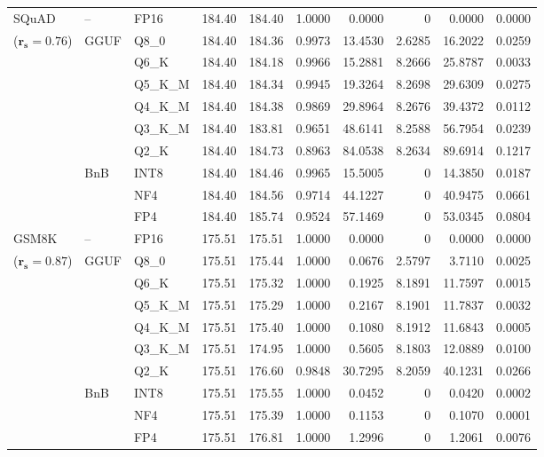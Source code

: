 \begin{longtable}{ll l rrrrrrr}
\midrule
SQuAD & -- & FP16 & 184.40 & 184.40 & 1.0000 & 0.0000 & \cellcolor{cyan!12} $0$ & 0.0000 & 0.0000 \\
{\small ($\mathbf{r_s{=}0.76}$)} & GGUF & Q8\_0 & 184.40 & 184.36 & 0.9973 & 13.4530 & 2.6285 & 16.2022 & 0.0259 \\
 &  & Q6\_K & 184.40 & 184.18 & 0.9966 & 15.2881 & 8.2666 & 25.8787 & 0.0033 \\
 &  & Q5\_K\_M & 184.40 & 184.34 & 0.9945 & 19.3264 & 8.2698 & 29.6309 & 0.0275 \\
 &  & Q4\_K\_M & 184.40 & 184.38 & 0.9869 & 29.8964 & 8.2676 & 39.4372 & 0.0112 \\
 &  & Q3\_K\_M & 184.40 & 183.81 & 0.9651 & 48.6141 & 8.2588 & 56.7954 & 0.0239 \\
 &  & Q2\_K & 184.40 & 184.73 & \cellcolor{red!18} 0.8963 & \cellcolor{red!18} 84.0538 & 8.2634 & \cellcolor{red!18} 89.6914 & \cellcolor{red!18} 0.1217 \\
 & BnB & INT8 & 184.40 & 184.46 & 0.9965 & 15.5005 & \cellcolor{cyan!12} $0$ & 14.3850 & 0.0187 \\
 &  & NF4 & 184.40 & 184.56 & 0.9714 & 44.1227 & \cellcolor{cyan!12} $0$ & 40.9475 & 0.0661 \\
 &  & FP4 & 184.40 & 185.74 & 0.9524 & 57.1469 & \cellcolor{cyan!12} $0$ & 53.0345 & 0.0804 \\
\midrule
GSM8K & -- & FP16 & 175.51 & 175.51 & 1.0000 & 0.0000 & \cellcolor{cyan!12} $0$ & 0.0000 & 0.0000 \\
{\small ($\mathbf{r_s{=}0.87}$)} & GGUF & Q8\_0 & 175.51 & 175.44 & 1.0000 & 0.0676 & 2.5797 & 3.7110 & 0.0025 \\
 &  & Q6\_K & 175.51 & 175.32 & 1.0000 & 0.1925 & 8.1891 & 11.7597 & 0.0015 \\
 &  & Q5\_K\_M & 175.51 & 175.29 & 1.0000 & 0.2167 & 8.1901 & 11.7837 & 0.0032 \\
 &  & Q4\_K\_M & 175.51 & 175.40 & 1.0000 & 0.1080 & 8.1912 & 11.6843 & 0.0005 \\
 &  & Q3\_K\_M & 175.51 & 174.95 & 1.0000 & 0.5605 & 8.1803 & 12.0889 & 0.0100 \\
 &  & Q2\_K & 175.51 & 176.60 & 0.9848 & 30.7295 & 8.2059 & 40.1231 & 0.0266 \\
 & BnB & INT8 & 175.51 & 175.55 & 1.0000 & 0.0452 & \cellcolor{cyan!12} $0$ & 0.0420 & 0.0002 \\
 &  & NF4 & 175.51 & 175.39 & 1.0000 & 0.1153 & \cellcolor{cyan!12} $0$ & 0.1070 & 0.0001 \\
 &  & FP4 & 175.51 & 176.81 & 1.0000 & 1.2996 & \cellcolor{cyan!12} $0$ & 1.2061 & 0.0076 \\

\end{longtable}
